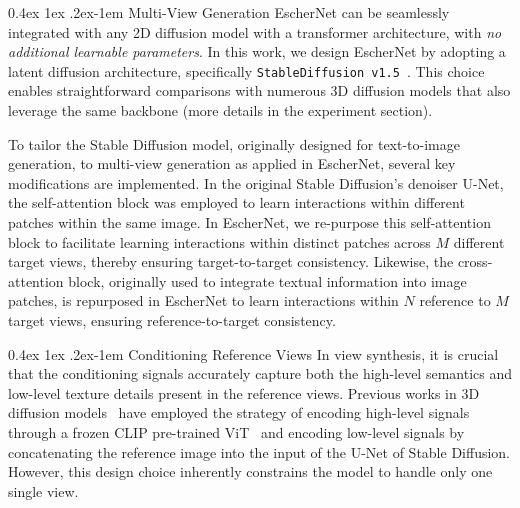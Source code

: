 \documentclass[10pt,twocolumn,letterpaper]{article}
\makeatletter
\renewcommand{\paragraph}{%
  \@startsection{paragraph}{4}%
  {\z@}{0.4ex \@plus 1ex \@minus .2ex}{-1em}%
  {\normalfont\normalsize\bfseries}%
}
\makeatother
\begin{document}
\paragraph{Multi-View Generation} EscherNet can be seamlessly integrated with any 2D diffusion model with a transformer architecture, with {\it no additional learnable parameters}. In this work, we design EscherNet by adopting a latent diffusion architecture, specifically {\tt StableDiffusion v1.5}~\cite{rombach2022ldm}. This choice enables straightforward comparisons with numerous 3D diffusion models that also leverage the same backbone (more details in the experiment section). 

To tailor the Stable Diffusion model, originally designed for text-to-image generation, to multi-view generation as applied in EscherNet, several key modifications are implemented. In the original Stable Diffusion's denoiser U-Net, the self-attention block was employed to learn interactions within different patches within the same image. In EscherNet, we re-purpose this self-attention block to facilitate learning interactions within distinct patches across $M$ different target views, thereby ensuring target-to-target consistency. Likewise, the cross-attention block, originally used to integrate textual information into image patches, is repurposed in EscherNet to learn interactions within $N$ reference to $M$ target views, ensuring reference-to-target consistency. 

\paragraph{Conditioning Reference Views} In view synthesis, it is crucial that the conditioning signals accurately capture both the high-level semantics and low-level texture details present in the reference views. Previous works in 3D diffusion models~\cite{liu2023zero,liu2023syncdreamer} have employed the strategy of encoding high-level signals through a frozen CLIP pre-trained ViT~\cite{radford2021clip} and encoding low-level signals by concatenating the reference image into the input of the U-Net of Stable Diffusion. However, this design choice inherently constrains the model to handle only one single view.
\end{document}
